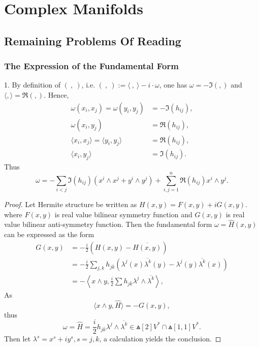 \chapter{Complex Manifolds}
\section{Remaining Problems Of Reading}
\subsection{The Expression of the Fundamental Form}
1. By definition of $(~ ,~ )$, i.e. $(~,~) := \langle ~,~\rangle-i\cdot \omega$, one has $\omega=-\Im( , )$ and $\langle , \rangle=\Re( , )$. Hence,
\begin{subequations}\label{w expression}
  \begin{align}
\omega(x_i,x_j) =\omega(y_i,y_j) &=-\Im(h_{ij}),\\
\omega(x_i,y_j) &=\Re(h_{ij}),\\
\langle x_i ,x_j\rangle =\langle y_i,y_j\rangle &=\Re(h_{ij}),\\
\langle x_i,y_j\rangle &=\Im(h_{ij}).
\end{align}
\end{subequations}
Thus
\[
  \omega=-\sum_{i<j} \Im(h_{ij})(x^i\wedge x^j+y^i\wedge y^j )+\sum_{i,j=1}^{n}\Re(h_{ij})x^i\wedge y^j.
\]
\begin{proof}
  Let Hermite structure be written as $H(x,y)=F(x,y)+iG(x,y)$. where $F(x,y)$ is  real value bilinear symmetry function and $G(x,y)$ is  real value bilinear anti-symmetry function. Then the fundamental form $\omega=\widehat{H}(x,y)$ can be expressed as the form
  \begin{align*}
    G(x,y) &=-\frac{i}{2}(H(x,y)-\overline{H(x,y)})\\
    &=-\frac{i}{2}\sum_{j,k} h_{j\overline{k}} (\lambda^j(x)\overline{\lambda^k}(y)-\lambda^j (y)\overline{\lambda^k}(x))\\
    &=-\left\langle x\wedge y,\frac{i}{2}\sum h_{j\overline{k}} \lambda^j\wedge\overline{\lambda^k}\right\rangle,
  \end{align*}
  As 
  \[
    \langle x\wedge y, \widehat{H}\rangle=-G(x,y),
  \]
  thus 
  \[
    \omega=\widehat{H}=\frac{i}{2}h_{j\overline{k}} \lambda^j\wedge\overline{\lambda^k}\in \Wedge[2] V^*\cap \Wedge[1,1] V^*.
  \]
    Then let $\lambda^s=x^s+i y^s, s=j,k$, a calculation yields the conclusion\cite{LDG}.
\end{proof}

